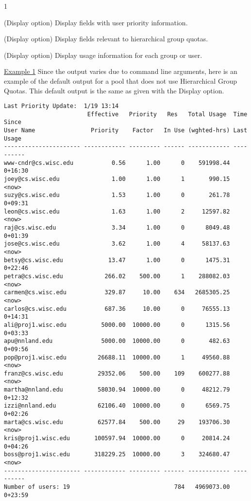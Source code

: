 \begin{ManPage}{\label{man-condor-userprio}}{1}
\begin{Options}
  {(Display option) Display fields with user priority information.  }

  {(Display option) Display fields relevant to hierarchical group quotas.  }

  {(Display option) Display usage information for each group or user.}

\end{Options}

\Examples

\underline{Example 1} Since the output varies due to command line arguments, 
here is an example of the default output for a pool that does not use 
Hierarchical Group Quotas.
This default output is the same as given with the  Display option.
\footnotesize
\begin{verbatim}
Last Priority Update:  1/19 13:14
                        Effective   Priority   Res   Total Usage  Time Since
User Name                Priority    Factor   In Use (wghted-hrs) Last Usage
---------------------- ------------ --------- ------ ------------ ----------
www-cndr@cs.wisc.edu           0.56      1.00      0    591998.44    0+16:30
joey@cs.wisc.edu               1.00      1.00      1       990.15 <now>
suzy@cs.wisc.edu               1.53      1.00      0       261.78    0+09:31
leon@cs.wisc.edu               1.63      1.00      2     12597.82 <now>
raj@cs.wisc.edu                3.34      1.00      0      8049.48    0+01:39
jose@cs.wisc.edu               3.62      1.00      4     58137.63 <now>
betsy@cs.wisc.edu             13.47      1.00      0      1475.31    0+22:46
petra@cs.wisc.edu            266.02    500.00      1    288082.03 <now>
carmen@cs.wisc.edu           329.87     10.00    634   2685305.25 <now>
carlos@cs.wisc.edu           687.36     10.00      0     76555.13    0+14:31
ali@proj1.wisc.edu          5000.00  10000.00      0      1315.56    0+03:33
apu@nnland.edu              5000.00  10000.00      0       482.63    0+09:56
pop@proj1.wisc.edu         26688.11  10000.00      1     49560.88 <now>
franz@cs.wisc.edu          29352.06    500.00    109    600277.88 <now>
martha@nnland.edu          58030.94  10000.00      0     48212.79    0+12:32
izzi@nnland.edu            62106.40  10000.00      0      6569.75    0+02:26
marta@cs.wisc.edu          62577.84    500.00     29    193706.30 <now>
kris@proj1.wisc.edu       100597.94  10000.00      0     20814.24    0+04:26
boss@proj1.wisc.edu       318229.25  10000.00      3    324680.47 <now>
---------------------- ------------ --------- ------ ------------ ----------
Number of users: 19                              784   4969073.00    0+23:59 
\end{verbatim}
\normalsize


\end{ManPage}
